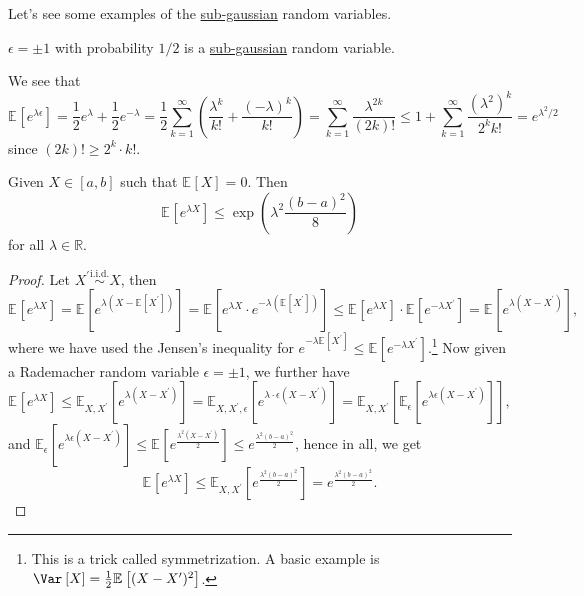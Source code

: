 Let's see some examples of the \hyperref[def:sub-gaussian]{sub-gaussian} random variables.

\begin{eg}
	\(\epsilon = \pm 1\) with probability \(1 / 2\) is a \hyperref[def:sub-gaussian]{sub-gaussian} random variable.

\end{eg}
\begin{explanation}
	We see that
	\[
		\mathbb{E}_{}\left[e^{\lambda \epsilon } \right]
		= \frac{1}{2} e^\lambda + \frac{1}{2} e^{-\lambda }
		= \frac{1}{2} \sum_{k=1}^{\infty} \left( \frac{\lambda ^k}{k!} + \frac{(-\lambda )^k}{k!} \right)
		= \sum_{k=1}^{\infty} \frac{\lambda ^{2k}}{(2k)!}
		\leq 1 + \sum_{k=1}^{\infty} \frac{(\lambda ^2)^k}{2^k k!}
		= e^{\lambda ^2 / 2}
	\]
	since \((2k)! \geq 2^k \cdot k!\).
\end{explanation}

\begin{lemma}
	Given \(X\in [a, b]\) such that \(\mathbb{E}_{}\left[X \right] = 0\). Then
	\[
		\mathbb{E}_{}\left[e^{\lambda X} \right] \leq \exp (\lambda ^2 \frac{(b-a)^2}{8})
	\]
	for all \(\lambda \in \mathbb{R} \).
\end{lemma}
\begin{proof}
	Let \(X^{\prime} \overset{\text{i.i.d.} }{\sim } X\), then
	\[
		\mathbb{E}_{}\left[e^{\lambda X} \right]
		= \mathbb{E}_{}\left[e^{\lambda (X - \mathbb{E}_{}\left[X^{\prime}  \right] )} \right]
		= \mathbb{E}_{}\left[e^{\lambda X}\cdot e^{-\lambda (\mathbb{E}_{}\left[X^{\prime}  \right] )} \right]
		\leq \mathbb{E}_{}\left[e^{\lambda X} \right] \cdot \mathbb{E}_{}\left[e^{-\lambda X^{\prime} } \right]
		= \mathbb{E}_{}\left[e^{\lambda (X - X^{\prime} )} \right],
	\]
	where we have used the Jensen's inequality for \(e^{-\lambda \mathbb{E}_{}\left[X^{\prime}  \right] } \leq \mathbb{E}_{}\left[e^{-\lambda X^{\prime} } \right] \).\footnote{This is a trick called symmetrization. A basic example is \(\Var_{}\left[X \right] = \frac{1}{2} \mathbb{E}_{}\left[(X - X^{\prime} )^2 \right] \).} Now given a Rademacher random variable \(\epsilon = \pm 1\), we further have
	\[
		\mathbb{E}_{}\left[e^{\lambda X} \right]
		\leq \mathbb{E}_{X, X^{\prime} }\left[e^{\lambda (X - X^{\prime} )} \right]
		= \mathbb{E}_{X, X^{\prime} , \epsilon }\left[ e^{\lambda \cdot \epsilon (X - X^{\prime} )} \right]
		= \mathbb{E}_{X, X^{\prime} }\left[ \mathbb{E}_{\epsilon }\left[e^{\lambda \epsilon (X - X^{\prime} )} \right]  \right] ,
	\]
	and \(\mathbb{E}_{\epsilon }\left[ e^{\lambda \epsilon (X - X^{\prime} )} \right] \leq \mathbb{E}_{}\left[e^{\frac{\lambda ^2(X - X^{\prime} )}{2}} \right] \leq e^{\frac{\lambda ^2(b - a)^2}{2}} \), hence in all, we get
	\[
		\mathbb{E}_{}\left[e^{\lambda X} \right] \leq \mathbb{E}_{X, X^{\prime} }\left[e^{\frac{\lambda ^2(b-a)^2}{2}} \right] = e^{\frac{\lambda ^2(b-a)^2}{2}}.
	\]
\end{proof}

